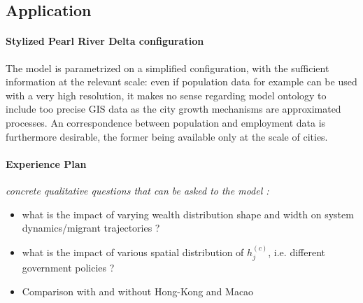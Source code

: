\subsection{Application}

\paragraph{Stylized Pearl River Delta configuration}

The model is parametrized on a simplified configuration, with the sufficient information at the relevant scale: even if population data for example can be used with a very high resolution, it makes no sense regarding model ontology to include too precise GIS data as the city growth mechanisms are approximated processes. An correspondence between population and employment data is furthermore desirable, the former being available only at the scale of cities.


\paragraph{Experience Plan}

\textit{concrete qualitative questions that can be asked to the model :}
\begin{itemize}
\item what is the impact of varying wealth distribution shape and width on system dynamics/migrant trajectories ?
\item what is the impact of various spatial distribution of $h_j^{(c)}$, i.e. different government policies ? 
\item Comparison with and without Hong-Kong and Macao 
\end{itemize}









